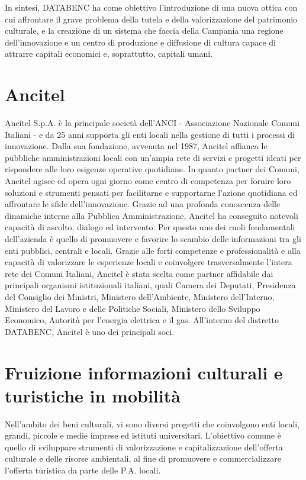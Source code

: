 In sintesi, DATABENC ha come obiettivo l'introduzione di una nuova ottica con cui affrontare il grave problema della tutela e della valorizzazione del patrimonio culturale, e la creazione di un sistema che faccia della Campania una regione dell'innovazione e un centro di produzione e diffusione di cultura capace di attrarre capitali economici e, soprattutto, capitali umani.


\section{Ancitel}

Ancitel S.p.A. \cite{www:ancitel} è la principale società dell'ANCI - Associazione Nazionale Comuni Italiani - e da 25 anni supporta gli enti locali nella gestione di tutti i processi di innovazione.
Dalla sua fondazione, avvenuta nel 1987,  Ancitel affianca le pubbliche amministrazioni locali con un'ampia rete di servizi e progetti ideati per rispondere alle loro esigenze operative quotidiane.
In quanto partner dei Comuni, Ancitel agisce ed opera ogni giorno come centro di competenza per fornire loro soluzioni e strumenti pensati per facilitarne e supportarne l'azione quotidiana ed affrontare le sfide dell'innovazione. 
Grazie ad una profonda conoscenza delle dinamiche interne alla Pubblica Amministrazione, Ancitel ha conseguito notevoli capacità di ascolto, dialogo ed intervento. Per questo uno dei ruoli fondamentali dell'azienda è quello di promuovere e favorire lo scambio delle informazioni tra gli enti pubblici, centrali e locali.
Grazie alle forti competenze e professionalità e alla capacità di valorizzare le esperienze locali e coinvolgere trasversalmente l'intera rete dei Comuni Italiani, Ancitel è stata scelta come partner affidabile dai principali organismi istituzionali italiani, quali Camera dei Deputati, Presidenza del Consiglio dei Ministri, Ministero dell'Ambiente, Ministero dell'Interno, Ministero del Lavoro e delle Politiche Sociali, Ministero dello Sviluppo Economico, Autorità per l'energia elettrica e il gas.
All'interno del distretto DATABENC, Ancitel è uno dei principali soci. 


\section{Fruizione informazioni culturali e turistiche in mobilità}
Nell'ambito dei beni culturali, vi sono diversi progetti che coinvolgono enti locali, grandi, piccole e medie imprese ed istituti universitari.
L'obiettivo comune è quello di sviluppare strumenti di valorizzazione e capitalizzazione dell'offerta culturale e delle risorse ambientali, al fine di promuovere e commercializzare l'offerta turistica da parte delle P.A. locali.

